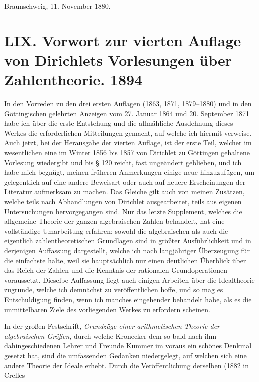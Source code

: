 \documentclass[11pt]{article}
\newcommand{\origpage}[1]{\par\vspace{0.25em}\noindent{\footnotesize\itshape [Gedruckte Seite #1]}\par\vspace{0.25em}}
\begin{document}
\begin{flushleft}Braunschweig, 11. November 1880.\end{flushleft}

\origpage{426}
\section*{LIX. Vorwort zur vierten Auflage von Dirichlets Vorlesungen über Zahlentheorie. 1894}

In den Vorreden zu den drei ersten Auflagen (1863, 1871, 1879--1880) und in den Göttingischen gelehrten Anzeigen vom 27. Januar 1864 und 20. September 1871 habe ich über die erste Entstehung und die allmähliche Ausdehnung dieses Werkes die erforderlichen Mitteilungen gemacht, auf welche ich hiermit verweise. Auch jetzt, bei der Herausgabe der vierten Auflage, ist der erste Teil, welcher im wesentlichen eine im Winter 1856 bis 1857 von Dirichlet zu Göttingen gehaltene Vorlesung wiedergibt und bis § 120 reicht, fast ungeändert geblieben, und ich habe mich begnügt, meinen früheren Anmerkungen einige neue hinzuzufügen, um gelegentlich auf eine andere Beweisart oder auch auf neuere Erscheinungen der Literatur aufmerksam zu machen. Das Gleiche gilt auch von meinen Zusätzen, welche teils nach Abhandlungen von Dirichlet ausgearbeitet, teils aus eigenen Untersuchungen hervorgegangen sind. Nur das letzte Supplement, welches die allgemeine Theorie der ganzen algebraischen Zahlen behandelt, hat eine vollständige Umarbeitung erfahren; sowohl die algebraischen als auch die eigentlich zahlentheoretischen Grundlagen sind in größter Ausführlichkeit und in derjenigen Auffassung dargestellt, welche ich nach langjähriger Überzeugung für die einfachste halte, weil sie hauptsächlich nur einen deutlichen Überblick über das Reich der Zahlen und die Kenntnis der rationalen Grundoperationen voraussetzt. Dieselbe Auffassung liegt auch einigen Arbeiten über die Idealtheorie zugrunde, welche ich demnächst zu veröffentlichen hoffe, und so mag es Entschuldigung finden, wenn ich manches eingehender behandelt habe, als es die unmittelbaren Ziele des vorliegenden Werkes zu erfordern scheinen.

In der großen Festschrift, \textit{Grundzüge einer arithmetischen Theorie der algebraischen Größen}, durch welche Kronecker dem so bald nach ihm dahingeschiedenen Lehrer und Freunde Kummer im voraus ein schönes Denkmal gesetzt hat, sind die umfassenden Gedanken niedergelegt, auf welchen sich eine andere Theorie der Ideale erhebt. Durch die Veröffentlichung derselben (1882 in Crelles
\end{document}
